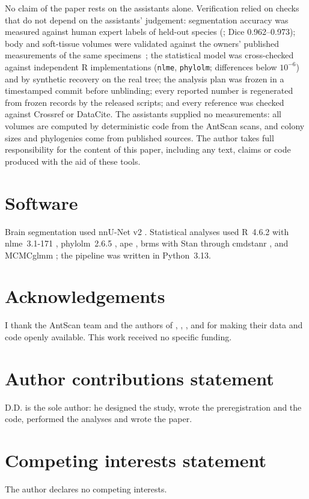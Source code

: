 \documentclass[11pt]{article}
\begin{document}
No claim of the paper rests on the assistants alone. Verification relied on checks that do not depend on the
assistants' judgement: segmentation accuracy was measured against human expert labels of held-out species
(\citealp{toulkeridou2023}; Dice 0.962--0.973); body and soft-tissue volumes were validated against the owners'
published measurements of the same specimens~\citep{matte2025}; the statistical model was cross-checked against
independent R implementations (\texttt{nlme}, \texttt{phylolm}; differences below $10^{-6}$) and by synthetic recovery
on the real tree; the analysis plan was frozen in a timestamped commit before unblinding; every reported number is
regenerated from frozen records by the released scripts; and every reference was checked against Crossref or
DataCite. The assistants supplied no measurements: all volumes are computed by deterministic code from the AntScan
scans, and colony sizes and phylogenies come from published sources. The author takes full responsibility for the
content of this paper, including any text, claims or code produced with the aid of these tools.

\section*{Software}

Brain segmentation used nnU-Net v2 \citep{isensee2021}. Statistical analyses used R~4.6.2 \citep{rcore2026} with
nlme~3.1-171 \citep{pinheiro2026nlme}, phylolm~2.6.5 \citep{ho2014}, ape \citep{paradis2019}, brms \citep{burkner2017}
with Stan through cmdstanr \citep{carpenter2017}, and MCMCglmm \citep{hadfield2010}; the pipeline was written in
Python~3.13.

\section*{Acknowledgements}

I thank the AntScan team and the authors of \citet{toulkeridou2023}, \citet{matte2025}, \citet{economo2018},
\citet{borowiec2025} and \citet{bellroberts2024} for making their data and code openly available. This work received
no specific funding.

\section*{Author contributions statement}

D.D. is the sole author: he designed the study, wrote the preregistration and the code, performed the analyses and
wrote the paper.

\section*{Competing interests statement}

The author declares no competing interests.




\appendix




\end{document}
